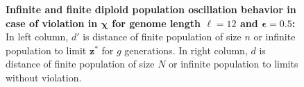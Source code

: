 \begin{figure}[H]
\begin{center}
\hspace{-3em}%
\vspace{-0.5em}  \hspace{-3em}%


\caption{\textbf{Infinite and finite diploid population oscillation behavior in case of violation in $\bm{\chi}$ for genome length $\ell = 12$ and $\bm{\epsilon} = 0.5$:} 
  In left column, $d'$ is distance of finite population of size $n$ or infinite population to limit $\bm{z}^\ast$ for $g$ generations. In right column, $d$ is distance of finite population of size $N$ or infinite population to limits without violation.}
\label{oscillation_12d_vio_chi_0.5}
\end{center}
\end{figure}

